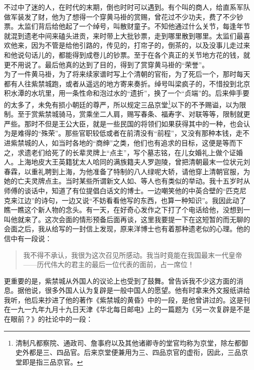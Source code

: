 不过中了迷的人，在时代的末期，倒也时时可以遇到。有个叫的商人，给直系军队做军装发了财，他为了想得一个穿黄马褂的赏赐，曾花过不少功夫，费了不少钞票。太监们背后给他起了一个绰号，叫散财童子。不知他通过什么关节，每逢年节就混到遗老中间来磕头进贡，来时带上大批钞票，走到哪里散到哪里。太监们最喜欢他来，因为不管是给他引路的，传见的，打帘子的，倒茶的，以及没事儿走过来和他说句话儿的，都能得到成卷儿的钞票。至于在各个真正的关节地方花的钱，就更不用说了。最后他真的达到了目的，得到了赏穿黄马褂的“荣誉”。\\

为了一件黄马褂，为了将来续家谱时写上个清朝的官衔，为了死后一个，那时每天都有人往紫禁城跑，或者从遥远的地方寄来奏折。绰号叫梁疯子的，不惜投到北京积水潭的水坑里，用一条性命和泡过水的“遗折”，换了一个“贞端”的。后来伸手要的太多了，未免有损小朝廷的尊严，所以规定三品京堂\footnote{清制凡都察院、通政司、詹事府以及其他诸卿寺的堂官均称为京堂，除左都御史外都是三、四品官。后来京堂便兼用为三、四品京官的虚衔，因此，三品京堂即是指三品京官。}以下的不予赐谥，以为限制。至于赏紫禁城骑马，赏乘坐二人肩，赐写春条、福寿字、对联等等，限制就更严些。那时不但是王公大臣，就是一些民国的将领们如果获得其中的一种，也会认为是难得的“殊荣”。那些官职较低或者在前清没有“前程”，又没有那种本钱，走不进紫禁城的人，如当时各地的“商绅”之类，他们也有追求的目标，这便是等而下之，求遗老们给死了的长辈灵牌上“点主”，写个墓志铭，在儿女婚礼上做个证婚人。上海地皮大王英籍犹太人哈同的满族籍夫人罗迦陵，曾把清朝最末一位状元刘春霖，以重礼聘到上海，为他准备了特制的八人绿呢大轿，请他穿上清朝官服，为她的亡夫灵牌点主。当时某些所谓新文人如、等人也有类似的举动。我十五岁时从师傅的谈话中，知道了有位提倡白话文的博士。一边嘲笑他的中英合壁的“匹克尼克来江边”的诗句，一边又说“不妨看看他写的东西，也算一种知识”。我因此动了瞧一瞧这个新人物的念头。有一天，在好奇心发作之下打了个电话给他，没想到一叫他就来了。这次会面的情形预备后面再谈，这里我要提一下在这短暂的而无聊的会面之后，我从给写的一封信上发现，原来洋博士也有着那种遗老似的心理。他的信中有一段说：\\

\begin{quote}
	我不得不承认，我很为这次召见所感动。我当时竟能在我国最末一代皇帝——历代伟大的君主的最后一位代表的面前，占一席位！\\
\end{quote}

更重要的是，紫禁城从外国人的议论上也受到了鼓舞。曾告诉我不少这方面的消息。据他说，很多外国人认为复辟是一般中国人的愿望。他有时拿来外文报纸讲给我听，他后来抄进了他的著作《紫禁城的黄昏》中的一段，是他曾讲过的。这是刊在一九一九年九月十九日天津《华北每日邮电》上的一篇题为《另一次复辟是不是在眼前？》的社论中的一段：\\


